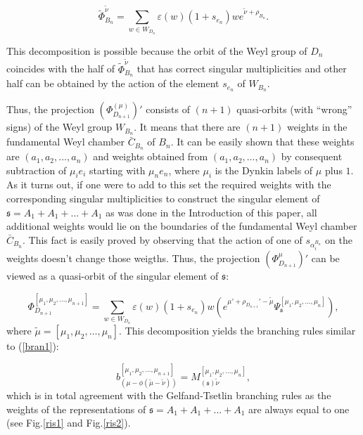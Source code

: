 \documentclass[12pt]{iopart}
\newcommand{\sfr}{\mathfrak{s}}
\begin{document}
\begin{equation}
\tilde\Phi^{\tilde\nu}_{B_n}=\sum_{w\in W_{D_n}} \varepsilon(w) (1+s_{e_n})w e^{\tilde\nu+\rho_{B_n}}.
\end{equation}

This decomposition is possible because the orbit of the Weyl group of $D_n$ coincides with the half
of $\tilde\Phi^{\tilde\nu}_{B_n}$ that has correct singular multiplicities and other half can be
obtained by the action of the element $s_{e_n}$ of $W_{B_{n}}$.

Thus, the projection $(\Phi^{(\mu)}_{D_{n+1}})'$ consists of $(n+1)$ quasi-orbits (with ``wrong'' signs) of the Weyl group
$W_{B_{n}}$. It means that there are $(n+1)$ weights in the fundamental Weyl chamber $\bar C_{B_n}$
of $B_n$. It can be easily shown that these weights are $(a_1,a_2,\dots,a_{n})$ and weights obtained
from $(a_1,a_2,\dots,a_{n})$ by consequent subtraction of $\mu_i e_i$ starting with $\mu_n e_n$,
where $\mu_i$ is the Dynkin labels of $\mu$ plus $1$. As it turns out, if one were to add to this set
the required weights with the corresponding singular multiplicities to construct the singular element of
$\sfr=A_1+A_1+\dots+A_1$ as was done in the Introduction of this paper, all additional weights would
lie on the boundaries of the fundamental Weyl chamber $\bar C_{B_n}$. This fact is easily proved by
observing that the action of one of $s_{\alpha_i^{B_n}}$ on the weights doesn't change those
weigths. Thus, the projection $(\Phi^{\mu}_{D_{n+1}})'$ can be viewed as a quasi-orbit of the
singular element of $\sfr$:

\begin{equation}
\Phi^{[\mu_1,\mu_2,\dots,\mu_{n+1}]}_{D_{n+1}}=\sum_{w\in W_{D_n}} \varepsilon(w) (1+s_{e_n})w (e^{\mu'+\rho_{D_{n+1}}'-\tilde\mu}\Psi^{[\mu_1,\mu_2,\dots,\mu_{n}]}_{\sfr}),
\end{equation}
where $\tilde\mu=[\mu_1,\mu_2,\dots,\mu_{n}]$. This decomposition yields the branching rules similar to (\ref{bran1}):

\begin{equation}
b_{\left( \mu -\phi \left( \widetilde{\mu }-\widetilde{\nu }\right) \right)
}^{[\mu_1,\mu_2,\dots,\mu_{n+1}]}=M_{\left( \sfr\right) \widetilde{\nu }}^{[\mu_1,\mu_2,\dots,\mu_{n}]}, 
\label{bran11}
\end{equation}
which is in total agreement with the Gelfand-Tsetlin branching rules as the weights of the representations of $\sfr=A_1+A_1+\dots+A_1$ are always equal to one (see Fig.\ref{ris1} and Fig.\ref{ris2}).
\end{document}

